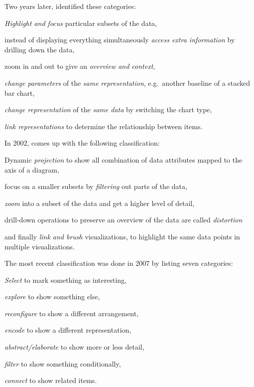 Two years later, \textcite{Dix1998} identified these categories:
\begin{enumerate*}[label=(\arabic*)]
  \item
    \emph{Highlight and focus} particular subsets of the data,
  \item
    instead of displaying everything simultaneously \emph{access extra information} by drilling down the data,
  \item
    zoom in and out to give an \emph{overview and context},
  \item
    \emph{change parameters} of the \emph{same representation}, e.g.\ another baseline of a stacked bar chart,
  \item
    \emph{change representation} of the \emph{same data} by switching the chart type,
  \item
    \emph{link representations} to determine the relationship between items.
\end{enumerate*}

In 2002, \textcite{Keim2002} comes up with the following classification:
\begin{enumerate*}[label=(\arabic*)]
  \item
    Dynamic \emph{projection} to show all combination of data attributes mapped to the axis of a diagram,
  \item
    focus on a smaller subsets by \emph{filtering} out parts of the data,
  \item
    \emph{zoom} into a subset of the data and get a higher level of detail,
  \item
     drill-down operations to preserve an overview of the data are called \emph{distortion}
  \item
    and finally \emph{link and brush} visualizations, to highlight the same data points in multiple visualizations.
\end{enumerate*}

The most recent classification was done in 2007 by \textcite{Yi2007} listing seven categories:
\begin{enumerate*}[label=(\arabic*)]
  \item
    \emph{Select} to mark something as interesting,
  \item
    \emph{explore} to show something else,
  \item
    \emph{reconfigure} to show a different arrangement,
  \item
    \emph{encode} to show a different representation,
  \item
    \emph{abstract/elaborate} to show more or less detail,
  \item
    \emph{filter} to show something conditionally,
  \item
    \emph{connect} to show related items.
\end{enumerate*}

